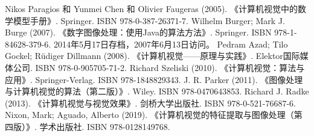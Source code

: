 Nikos Paragios 和 Yunmei Chen 和 Olivier Faugeras (2005). 《计算机视觉中的数学模型手册》. Springer. ISBN 978-0-387-26371-7.  
Wilhelm Burger; Mark J. Burge (2007). 《数字图像处理：使用Java的算法方法》. Springer. ISBN 978-1-84628-379-6. 2014年5月17日存档，2007年6月13日访问。  
Pedram Azad; Tilo Gockel; Rüdiger Dillmann (2008). 《计算机视觉——原理与实践》. Elektor国际媒体公司. ISBN 978-0-905705-71-2.  
Richard Szeliski (2010). 《计算机视觉：算法与应用》. Springer-Verlag. ISBN 978-1848829343.  
J. R. Parker (2011). 《图像处理与计算机视觉的算法（第二版）》. Wiley. ISBN 978-0470643853.  
Richard J. Radke (2013). 《计算机视觉与视觉效果》. 剑桥大学出版社. ISBN 978-0-521-76687-6.  
Nixon, Mark; Aguado, Alberto (2019). 《计算机视觉的特征提取与图像处理（第四版）》. 学术出版社. ISBN 978-0128149768.